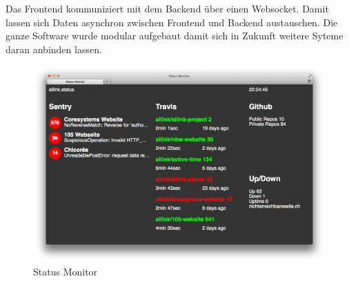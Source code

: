 Das Frontend kommuniziert mit dem Backend über einen Websocket. Damit lassen sich Daten asynchron zwischen Frontend und Backend austauschen. Die ganze Software wurde modular aufgebaut damit sich in Zukunft weitere Syteme daran anbinden lassen.

\begin{figure}[ht]
\centering
\includegraphics[width=1\textwidth]{images/status_monitor.png}
\caption{Status Monitor}
\label{fig:status_monitor}
\end{figure}
